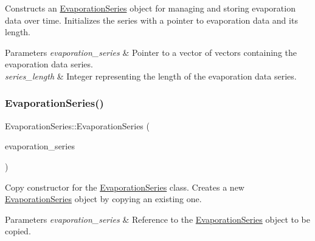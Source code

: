 Constructs an {\ttfamily \mbox{\hyperlink{classEvaporationSeries}{Evaporation\+Series}}} object for managing and storing evaporation data over time. Initializes the series with a pointer to evaporation data and its length. 


\begin{DoxyParams}{Parameters}
{\em evaporation\+\_\+series} & Pointer to a vector of vectors containing the evaporation data series. \\
\hline
{\em series\+\_\+length} & Integer representing the length of the evaporation data series. \\
\hline
\end{DoxyParams}
\mbox{\label{classEvaporationSeries_aa8d8cd8bbc0fd5b368b748cb090ad414}} 
\subsubsection{\texorpdfstring{Evaporation\+Series()}{EvaporationSeries()}\hspace{0.1cm}{\footnotesize\ttfamily [2/2]}}
{\footnotesize\ttfamily Evaporation\+Series\+::\+Evaporation\+Series (\begin{DoxyParamCaption}\item[{const \mbox{\hyperlink{classEvaporationSeries}{Evaporation\+Series}} \&}]{evaporation\+\_\+series }\end{DoxyParamCaption})}



Copy constructor for the {\ttfamily \mbox{\hyperlink{classEvaporationSeries}{Evaporation\+Series}}} class. Creates a new {\ttfamily \mbox{\hyperlink{classEvaporationSeries}{Evaporation\+Series}}} object by copying an existing one. 


\begin{DoxyParams}{Parameters}
{\em evaporation\+\_\+series} & Reference to the {\ttfamily \mbox{\hyperlink{classEvaporationSeries}{Evaporation\+Series}}} object to be copied. \\
\hline
\end{DoxyParams}
\mbox{\label{classEvaporationSeries_a201a00eaaadc9c523d544e0d6a4c50e5}} 
